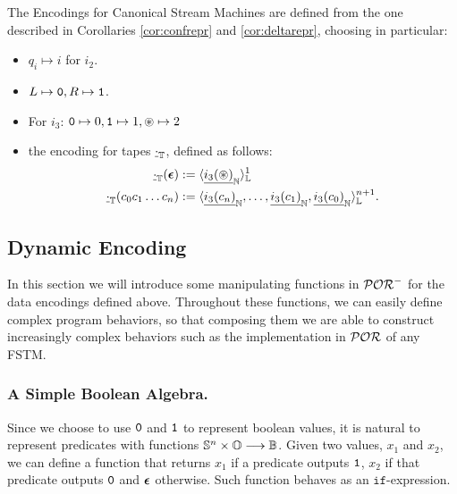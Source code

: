 \begin{defn}
  \label{def:canencs}
  The Encodings for Canonical Stream Machines are defined from
  the one described in Corollaries \ref{cor:confrepr} and \ref{cor:deltarepr},
  choosing in particular:
  \begin{itemize}
    \item $q_i \mapsto i$ for $i_2$.
    \item $L\mapsto \mathtt{0}, R\mapsto \mathtt{1}$.
    \item For $i_3$: $\mathtt{0} \mapsto 0, \mathtt{1} \mapsto 1, \circledast \mapsto 2$
    \item the encoding for tapes $\underline \cdot_{\mathbb{T}}$, defined as follows:
    \begin{align*}
    \underline \cdot_{\mathbb{T}}(\bm{\epsilon})&:=\langle{{\underline{i_3(\circledast)}}_{\mathbb{N}}}\rangle^{1}_{\mathbb{L}}\\
    \underline \cdot_{\mathbb{T}}(c_0c_1\ldots c_n)&:=\langle{{\underline{i_3(c_n)}}_{\mathbb{N}},\ldots,
    {\underline{i_3(c_1)}}_{\mathbb{N}}, {\underline{i_3(c_0)}}_{\mathbb{N}}}\rangle^{n+1}_{\mathbb{L}}.
    \end{align*}
  \end{itemize}
\end{defn}




















\subsection{Dynamic Encoding}
\label{sec:dynenc}
In this section we will introduce some manipulating functions in
$\mathcal{POR}^-$ for
the data encodings defined above. Throughout these functions, we can easily define complex program behaviors,
so that composing them we are able to construct increasingly complex behaviors such as the implementation in $\mathcal{POR}$ of any FSTM.

\subsubsection{A Simple Boolean Algebra.}
\label{subsub:booleanlalgebra}

Since we choose to use $\mathtt{0}$ and
$\mathtt{1}$ to represent boolean values,
it is natural to represent predicates
with functions $\mathbb{S}^n \times \mathbb{O} \longrightarrow \mathbb{B}$.
%
Given two values, $x_1$ and $x_2$,
we can define a function that
returns $x_1$ if a predicate outputs $\mathtt{1}$,
$x_2$ if that predicate outputs $\mathtt{0}$
and $\bm{\epsilon}$ otherwise.
Such function behaves as an $\mathtt{if}$-expression.



